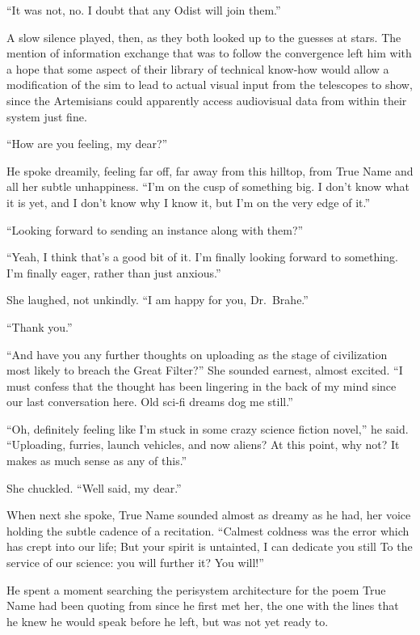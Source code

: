 ``It was not, no. I doubt that any Odist will join them.''

A slow silence played, then, as they both looked up to the guesses at stars. The mention of information exchange that was to follow the convergence left him with a hope that some aspect of their library of technical know-how would allow a modification of the sim to lead to actual visual input from the telescopes to show, since the Artemisians could apparently access audiovisual data from within their system just fine.

``How are you feeling, my dear?''

He spoke dreamily, feeling far off, far away from this hilltop, from True Name and all her subtle unhappiness. ``I'm on the cusp of something big. I don't know what it is yet, and I don't know why I know it, but I'm on the very edge of it.''

``Looking forward to sending an instance along with them?''

``Yeah, I think that's a good bit of it. I'm finally looking forward to something. I'm finally eager, rather than just anxious.''

She laughed, not unkindly. ``I am happy for you, Dr.~Brahe.''

``Thank you.''

``And have you any further thoughts on uploading as the stage of civilization most likely to breach the Great Filter?'' She sounded earnest, almost excited. ``I must confess that the thought has been lingering in the back of my mind since our last conversation here. Old sci-fi dreams dog me still.''

``Oh, definitely feeling like I'm stuck in some crazy science fiction novel,'' he said. ``Uploading, furries, launch vehicles, and now aliens? At this point, why not? It makes as much sense as any of this.''

She chuckled. ``Well said, my dear.''

When next she spoke, True Name sounded almost as dreamy as he had, her voice holding the subtle cadence of a recitation. ``Calmest coldness was the error which has crept into our life; But your spirit is untainted, I can dedicate you still To the service of our science: you will further it? You will!''

He spent a moment searching the perisystem architecture for the poem True Name had been quoting from since he first met her, the one with the lines that he knew he would speak before he left, but was not yet ready to.

